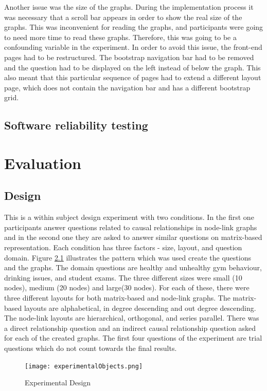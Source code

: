 \documentclass{l4proj}
\begin{document}
Another issue was the size of the graphs. During the implementation process it was necessary that a scroll bar appears in order to show the real size of the graphs. This was inconvenient for reading the graphs, and participants were going to need more time to read these graphs. Therefore, this was going to be a confounding variable in the experiment. In order to avoid this issue, the front-end pages had to be restructured. The bootstrap navigation bar had to be removed and the question had to be displayed on the left instead of below the graph. This also meant that this particular sequence of pages had to extend a different layout page, which does not contain the navigation bar and has a different bootstrap grid.

\section{Software reliability testing}

\chapter{Evaluation}
\section{Design}

This is a within subject design experiment with two conditions. In the first one participants answer questions related to causal relationships in node-link graphs and in the second one they are asked to answer similar questions on matrix-based representation. Each condition has three factors - size, layout, and question domain. Figure \ref{experimentalDesign} illustrates the pattern which was used create the questions and the graphs. The domain questions are healthy and unhealthy gym behaviour, drinking issues, and student exams. The three different sizes were small (10 nodes), medium (20 nodes) and large(30 nodes). For each of these, there were three different layouts for both matrix-based and node-link graphs. The matrix-based layouts are alphabetical, in degree descending and out degree descending. The node-link layouts are hierarchical, orthogonal, and series parallel.  There was a direct relationship question and an indirect causal relationship question asked for each of the created graphs. The first four questions of the experiment are trial questions which do not count towards the final results.

\begin{figure}[H]
\centering
\texttt{[image: experimentalObjects.png]}
\caption{Experimental Design}
\label{experimentalDesign}
\end{figure}
\end{document}
